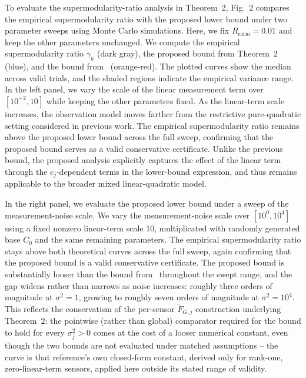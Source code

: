 \documentclass[letterpaper, 10 pt, conference]{ieeeconf}  %
\begin{document}
To evaluate the supermodularity-ratio analysis in Theorem~2, Fig.~2 compares the empirical supermodularity ratio with the proposed lower bound under two parameter sweeps using Monte Carlo simulations. Here, we fix $R_{\mathrm{ratio}}=0.01$ and keep the other parameters unchanged. We compute the empirical supermodularity ratio $\gamma_h$ (dark gray), the proposed bound from Theorem~2 (blue), and the bound from~\cite{c19} (orange-red). The plotted curves show the median across valid trials, and the shaded regions indicate the empirical variance range. In the left panel, we vary the scale of the linear measurement term over $[10^{-2}, 10]$ while keeping the other parameters fixed. As the linear-term scale increases, the observation model moves farther from the restrictive pure-quadratic setting considered in previous work. The empirical supermodularity ratio remains above the proposed lower bound across the full sweep, confirming that the proposed bound serves as a valid conservative certificate. Unlike the previous bound, the proposed analysis explicitly captures the effect of the linear term through the $c_j$-dependent terms in the lower-bound expression, and thus remains applicable to the broader mixed linear-quadratic model.



In the right panel, we evaluate the proposed lower bound under a sweep of the measurement-noise scale. We vary the measurement-noise scale over $[10^{0},10^{4}]$ using a fixed nonzero linear-term scale $10$, multiplicated with randomly generated base $C_0$ and the same remaining parameters. The empirical supermodularity ratio stays above both theoretical curves across the full sweep, again confirming that the proposed bound is a valid conservative certificate. The proposed bound is substantially looser than the bound from~\cite{c19} throughout the swept range, and the gap widens rather than narrows as noise increases: roughly three orders of magnitude at $\sigma^2=1$, growing to roughly seven orders of magnitude at $\sigma^2=10^4$. This reflects the conservatism of the per-sensor $\widetilde F_{G,j}$ construction underlying Theorem~2: the pointwise (rather than global) comparator required for the bound to hold for every $\sigma_j^2>0$ comes at the cost of a looser numerical constant, even though the two bounds are not evaluated under matched assumptions -- the~\cite{c19} curve is that reference's own closed-form constant, derived only for rank-one, zero-linear-term sensors, applied here outside its stated range of validity.
\end{document}
